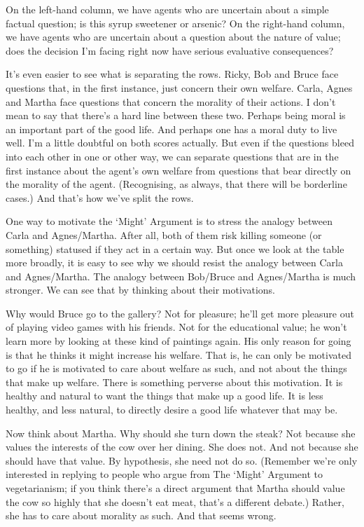 \documentclass[
  11pt,
  letterpaper,
  DIV=11,
  numbers=noendperiod,
  twoside]{scrartcl}
\begin{document}
On the left-hand column, we have agents who are uncertain about a simple
factual question; is this syrup sweetener or arsenic? On the right-hand
column, we have agents who are uncertain about a question about the
nature of value; does the decision I'm facing right now have serious
evaluative consequences?

It's even easier to see what is separating the rows. Ricky, Bob and
Bruce face questions that, in the first instance, just concern their own
welfare. Carla, Agnes and Martha face questions that concern the
morality of their actions. I don't mean to say that there's a hard line
between these two. Perhaps being moral is an important part of the good
life. And perhaps one has a moral duty to live well. I'm a little
doubtful on both scores actually. But even if the questions bleed into
each other in one or other way, we can separate questions that are in
the first instance about the agent's own welfare from questions that
bear directly on the morality of the agent. (Recognising, as always,
that there will be borderline cases.) And that's how we've split the
rows.

One way to motivate the `Might' Argument is to stress the analogy
between Carla and Agnes/Martha. After all, both of them risk killing
someone (or something) statused if they act in a certain way. But once
we look at the table more broadly, it is easy to see why we should
resist the analogy between Carla and Agnes/Martha. The analogy between
Bob/Bruce and Agnes/Martha is much stronger. We can see that by thinking
about their motivations.

Why would Bruce go to the gallery? Not for pleasure; he'll get more
pleasure out of playing video games with his friends. Not for the
educational value; he won't learn more by looking at these kind of
paintings again. His only reason for going is that he thinks it might
increase his welfare. That is, he can only be motivated to go if he is
motivated to care about welfare as such, and not about the things that
make up welfare. There is something perverse about this motivation. It
is healthy and natural to want the things that make up a good life. It
is less healthy, and less natural, to directly desire a good life
whatever that may be.

Now think about Martha. Why should she turn down the steak? Not because
she values the interests of the cow over her dining. She does not. And
not because she should have that value. By hypothesis, she need not do
so. (Remember we're only interested in replying to people who argue from
The `Might' Argument to vegetarianism; if you think there's a direct
argument that Martha should value the cow so highly that she doesn't eat
meat, that's a different debate.) Rather, she has to care about morality
as such. And that seems wrong.
\end{document}
